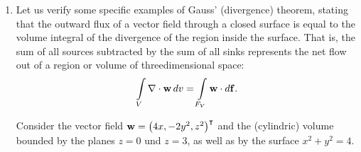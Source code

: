 {\begin{enumerate}
\begin{eqnarray*}
\mbox{rot}{\bf w}& =& \nabla \times {\bf w}  \\
  \varepsilon_{ijk}\partial_j w_k & = &
   \equiv  \varepsilon_{ijk}
    \left[
      \left(-\frac{1}{r^2}\right)\left(\frac{1}{2r}\right)
      2 r_j p_k +
      \frac{1}{r}p_k'
      \left(-\frac{1}{c}\right)\left(\frac{1}{2r}\right)2r_j
    \right]= \\
  & = & -\frac{1}{r^3}\varepsilon_{ijk}r_j p_k -\frac{1}{cr^2}
    \varepsilon_{ijk}r_j p_k' = \\
  & \equiv & -\frac{1}{r^3}\left({\bf r} \times {\bf p}\right)-
    \frac{1}{cr^2}\left({\bf r} \times {\bf p}'\right)   .
\end{eqnarray*}

\item
Let us verify  some specific examples of Gauss' (divergence) theorem,
stating that the outward flux of a vector field through a closed surface
is equal to the volume integral of the divergence of the region inside the surface.
That is, the sum of all sources subtracted by the sum of all sinks represents the net flow out of a region or volume of threedimensional space:
\begin{equation}
\int \limits_V \nabla \cdot {\bf w} \, dv   =\int \limits_{F_V} {\bf w} \cdot d{\bf f}
.   \label{2011-m-gauss}
\end{equation}

Consider the vector field ${\bf w} = \begin{pmatrix} 4x , -2y^2 , z^2\end{pmatrix}^\intercal $
and the (cylindric) volume bounded by the planes  $z=0$ und $z=3$,
as well as by the surface
$x^2 + y^2 = 4$.



\end{enumerate}}

